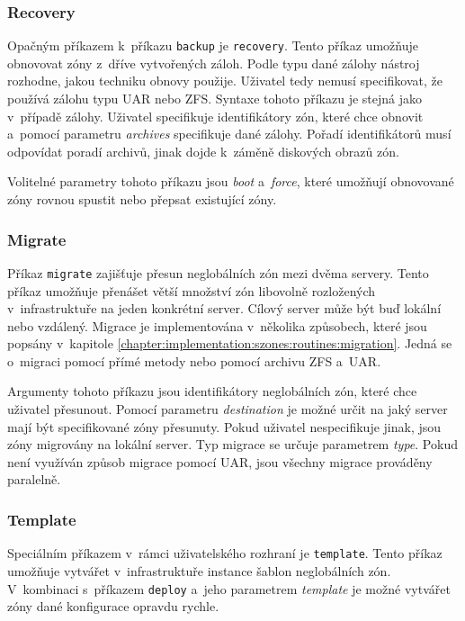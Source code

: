 \subsubsection{Recovery}
\label{chapter:implementation:client:cli:recovery}
Opačným příkazem k~příkazu \verb|backup| je \verb|recovery|. Tento příkaz umožňuje obnovovat zóny z~dříve vytvořených záloh.
Podle typu dané zálohy nástroj rozhodne, jakou techniku obnovy použije. Uživatel tedy nemusí specifikovat, že používá zálohu
typu UAR nebo ZFS. Syntaxe tohoto příkazu je stejná jako v~případě zálohy. Uživatel specifikuje identifikátory zón, které
chce obnovit a~pomocí parametru \textit{archives} specifikuje dané zálohy. Pořadí identifikátorů musí odpovídat poradí archivů, jinak
dojde k~záměně diskových obrazů zón.

Volitelné parametry tohoto příkazu jsou \textit{boot} a~\textit{force}, které umožňují obnovované zóny rovnou spustit nebo
přepsat existující zóny.
\subsubsection{Migrate}
\label{chapter:implementation:client:cli:migrate}
Příkaz \verb|migrate| zajišťuje přesun neglobálních zón mezi dvěma servery. Tento příkaz umožňuje přenášet větší množství zón
libovolně rozložených v~infrastruktuře na jeden konkrétní server. Cílový server může být buď lokální nebo vzdálený. Migrace
je implementována v~několika způsobech, které jsou popsány v~kapitole \ref{chapter:implementation:szones:routines:migration}.
Jedná se o~migraci pomocí přímé metody nebo pomocí archivu ZFS a~UAR.

Argumenty tohoto příkazu jsou identifikátory neglobálních zón, které chce uživatel přesunout. Pomocí parametru \textit{destination}
je možné určit na jaký server mají být specifikované zóny přesunuty. Pokud uživatel nespecifikuje jinak, jsou zóny migrovány
na lokální server. Typ migrace se určuje parametrem \textit{type}. Pokud není využíván způsob migrace pomocí UAR, jsou všechny
migrace prováděny paralelně.
\subsubsection{Template}
\label{chapter:implementation:client:cli:template}
Speciálním příkazem v~rámci uživatelského rozhraní je \verb|template|. Tento příkaz umožňuje vytvářet v~infrastruktuře instance
šablon neglobálních zón. V~kombinaci s~příkazem \verb|deploy| a~jeho parametrem \textit{template} je možné vytvářet zóny
dané konfigurace opravdu rychle.

